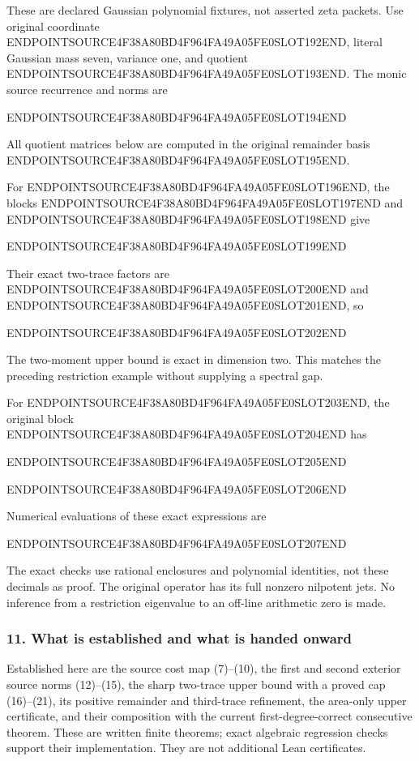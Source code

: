 These are declared Gaussian polynomial fixtures, not asserted zeta packets. Use original coordinate ENDPOINTSOURCE4F38A80BD4F964FA49A05FE0SLOT192END, literal Gaussian mass seven, variance one, and quotient ENDPOINTSOURCE4F38A80BD4F964FA49A05FE0SLOT193END. The monic source recurrence and norms are

ENDPOINTSOURCE4F38A80BD4F964FA49A05FE0SLOT194END

All quotient matrices below are computed in the original remainder basis ENDPOINTSOURCE4F38A80BD4F964FA49A05FE0SLOT195END.

For ENDPOINTSOURCE4F38A80BD4F964FA49A05FE0SLOT196END, the blocks ENDPOINTSOURCE4F38A80BD4F964FA49A05FE0SLOT197END and ENDPOINTSOURCE4F38A80BD4F964FA49A05FE0SLOT198END give

ENDPOINTSOURCE4F38A80BD4F964FA49A05FE0SLOT199END

Their exact two-trace factors are ENDPOINTSOURCE4F38A80BD4F964FA49A05FE0SLOT200END and ENDPOINTSOURCE4F38A80BD4F964FA49A05FE0SLOT201END, so

ENDPOINTSOURCE4F38A80BD4F964FA49A05FE0SLOT202END

The two-moment upper bound is exact in dimension two. This matches the preceding restriction example without supplying a spectral gap.

For ENDPOINTSOURCE4F38A80BD4F964FA49A05FE0SLOT203END, the original block ENDPOINTSOURCE4F38A80BD4F964FA49A05FE0SLOT204END has

ENDPOINTSOURCE4F38A80BD4F964FA49A05FE0SLOT205END

ENDPOINTSOURCE4F38A80BD4F964FA49A05FE0SLOT206END

Numerical evaluations of these exact expressions are

ENDPOINTSOURCE4F38A80BD4F964FA49A05FE0SLOT207END

The exact checks use rational enclosures and polynomial identities, not these decimals as proof. The original operator has its full nonzero nilpotent jets. No inference from a restriction eigenvalue to an off-line arithmetic zero is made.

\subsubsection{11. What is established and what is handed onward}\label{endpoint-relation_moment_original--what-is-established-and-what-is-handed-onward}

Established here are the source cost map (7)--(10), the first and second exterior source norms (12)--(15), the sharp two-trace upper bound with a proved cap (16)--(21), its positive remainder and third-trace refinement, the area-only upper certificate, and their composition with the current first-degree-correct consecutive theorem. These are written finite theorems; exact algebraic regression checks support their implementation. They are not additional Lean certificates.

